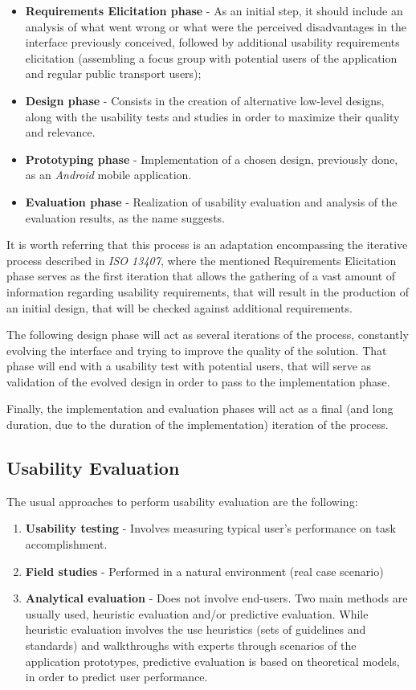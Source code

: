 \begin{itemize}
\item \textbf{Requirements Elicitation phase} - As an initial step, it should include an analysis of what went wrong or what were the perceived disadvantages in the interface previously conceived, followed by additional usability requirements elicitation (assembling a focus group with potential users of the application and regular public transport users);
\item \textbf{Design phase} - Consists in the creation of alternative low-level designs, along with the usability tests and studies in order to maximize their quality and relevance.
\item \textbf{Prototyping phase} - Implementation of a chosen design, previously done, as an \emph{Android} mobile application.
\item \textbf{Evaluation phase} - Realization of usability evaluation and analysis of the evaluation results, as the name suggests.
\end{itemize}

It is worth referring that this process is an adaptation encompassing the iterative process described in \emph{ISO 13407}, where the mentioned Requirements Elicitation phase serves as the first iteration that allows the gathering of a vast amount of information regarding usability requirements, that will result in the production of an initial design, that will be checked against additional requirements.

The following design phase will act as several iterations of the process, constantly evolving the interface and trying to improve the quality of the solution. That phase will end with a usability test with potential users, that will serve as validation of the evolved design in order to pass to the implementation phase.

Finally, the implementation and evaluation phases will act as a final (and long duration, due to the duration of the implementation) iteration of the process. 

\subsection{Usability Evaluation}

The usual approaches to perform usability evaluation are the following:

\begin{enumerate}
\item \textbf{Usability testing} - Involves measuring typical user's performance on task accomplishment.
\item \textbf{Field studies} - Performed in a natural environment (real case scenario)
\item \textbf{Analytical evaluation} - Does not involve end-users. Two main methods are usually used, heuristic evaluation and/or predictive evaluation. While heuristic evaluation involves the use heuristics (sets of guidelines and standards) and walkthroughs with experts through scenarios of the application prototypes, predictive evaluation is based on theoretical models, in order to predict user performance.
\end{enumerate}

